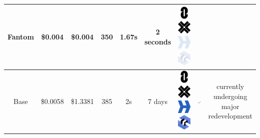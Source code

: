\documentclass[fleqn,10pt]{olplainarticle}
\begin{document}
\begin{table}[H]
\begin{tabular}{|c|c|c|c|c|c|c|c|c|}
		Fantom & \cellcolor[RGB]{100,255,100}\$0.004 & \cellcolor[RGB]{100,255,100}\$0.004 & \cellcolor[RGB]{255,150,0}350 & \cellcolor[RGB]{100,255,100}1.67s  & \cellcolor[RGB]{100,255,100}2 seconds \cite{_v_khatibi_how_2023} & \includegraphics[width=0.03\linewidth]{img/logoLayerZero} \includegraphics[width=0.03\linewidth]{img/logoAxelar}
		\includegraphics[width=0.03\linewidth]{img/logoHyperlaneOPA} \includegraphics[width=0.03\linewidth]{img/logoCCIPOPA} & & \\ \hline
		
		Base & \cellcolor[RGB]{150,255,100}\$0.0058 & \cellcolor[RGB]{255,50,0}\$1.3381 & \cellcolor[RGB]{255,200,0}385 & \cellcolor[RGB]{130,255,10}2s  & \cellcolor[RGB]{255,0,0}7 days\cite{optimism_understanding_nodate} & \includegraphics[width=0.03\linewidth]{img/logoLayerZero} \includegraphics[width=0.03\linewidth]{img/logoAxelar} \includegraphics[width=0.03\linewidth]{img/logoHyperlane} \includegraphics[width=0.03\linewidth]{img/logoCCIP} & \includegraphics[width=0.03\linewidth]{img/check} & \makecell{currently undergoing \\ major redevelopment\cite{optimism_fault_nodate}} \\  \hline		
		

\end{tabular}
\end{table}
\end{document}
